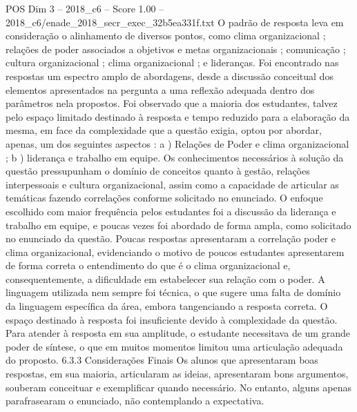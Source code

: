 \begin{textsample}{POS Dim 3 – 2018\_c6 – Score 1.00 – 2018\_c6/enade\_2018\_secr\_exec\_32b5ea331f.txt}
O padrão de resposta leva em consideração o alinhamento de diversos pontos, como clima organizacional ; relações de poder associados a objetivos e metas organizacionais ; comunicação ; cultura organizacional ; clima organizacional ; e lideranças.
Foi encontrado nas respostas um espectro amplo de abordagens, desde a discussão conceitual dos elementos apresentados na pergunta a uma reflexão adequada dentro dos parâmetros nela propostos.
Foi observado que a maioria dos estudantes, talvez pelo espaço limitado destinado à resposta e tempo reduzido para a elaboração da mesma, em face da complexidade que a questão exigia, optou por abordar, apenas, um dos seguintes aspectos : a ) Relações de Poder e clima organizacional ; b ) liderança e trabalho em equipe.
Os conhecimentos necessários à solução da questão pressupunham o domínio de conceitos quanto à gestão, relações interpessoais e cultura organizacional, assim como a capacidade de articular as temáticas fazendo correlações conforme solicitado no enunciado.
O enfoque escolhido com maior frequência pelos estudantes foi a discussão da liderança e trabalho em equipe, e poucas vezes foi abordado de forma ampla, como solicitado no enunciado da questão.
Poucas respostas apresentaram a correlação poder e clima organizacional, evidenciando o motivo de poucos estudantes apresentarem de forma correta o entendimento do que é o clima organizacional e, consequentemente, a dificuldade em estabelecer sua relação com o poder.
A linguagem utilizada nem sempre foi técnica, o que sugere uma falta de domínio da linguagem específica da área, embora tangenciando a resposta correta.
O espaço destinado à resposta foi insuficiente devido à complexidade da questão.
Para atender à resposta em sua amplitude, o estudante necessitava de um grande poder de síntese, o que em muitos momentos limitou uma articulação adequada do proposto. 6.3.3 Considerações Finais Os alunos que apresentaram boas respostas, em sua maioria, articularam as ideias, apresentaram bons argumentos, souberam conceituar e exemplificar quando necessário.
No entanto, alguns apenas parafrasearam o enunciado, não contemplando a expectativa.

\end{textsample}
